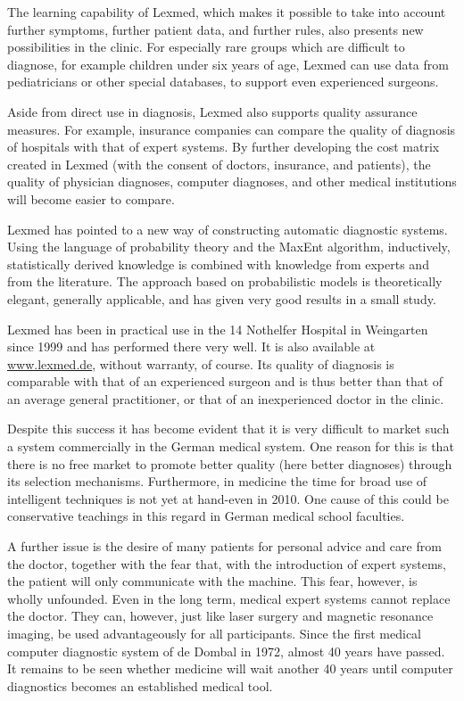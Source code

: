 \documentclass[10pt]{book}
\begin{document}
The learning capability of Lexmed, which makes it possible to take into account further symptoms, further patient data, and further rules, also presents new possibilities in the clinic. For especially rare groups which are difficult to diagnose, for example children under six years of age, Lexmed can use data from pediatricians or other special databases, to support even experienced surgeons.

Aside from direct use in diagnosis, Lexmed also supports quality assurance measures. For example, insurance companies can compare the quality of diagnosis of hospitals with that of expert systems. By further developing the cost matrix created in Lexmed (with the consent of doctors, insurance, and patients), the quality of physician diagnoses, computer diagnoses, and other medical institutions will become easier to compare.

Lexmed has pointed to a new way of constructing automatic diagnostic systems. Using the language of probability theory and the MaxEnt algorithm, inductively,\\
statistically derived knowledge is combined with knowledge from experts and from the literature. The approach based on probabilistic models is theoretically elegant, generally applicable, and has given very good results in a small study.

Lexmed has been in practical use in the 14 Nothelfer Hospital in Weingarten since 1999 and has performed there very well. It is also available at \href{http://www.lexmed.de}{www.lexmed.de}, without warranty, of course. Its quality of diagnosis is comparable with that of an experienced surgeon and is thus better than that of an average general practitioner, or that of an inexperienced doctor in the clinic.

Despite this success it has become evident that it is very difficult to market such a system commercially in the German medical system. One reason for this is that there is no free market to promote better quality (here better diagnoses) through its selection mechanisms. Furthermore, in medicine the time for broad use of intelligent techniques is not yet at hand-even in 2010. One cause of this could be conservative teachings in this regard in German medical school faculties.

A further issue is the desire of many patients for personal advice and care from the doctor, together with the fear that, with the introduction of expert systems, the patient will only communicate with the machine. This fear, however, is wholly unfounded. Even in the long term, medical expert systems cannot replace the doctor. They can, however, just like laser surgery and magnetic resonance imaging, be used advantageously for all participants. Since the first medical computer diagnostic system of de Dombal in 1972, almost 40 years have passed. It remains to be seen whether medicine will wait another 40 years until computer diagnostics becomes an established medical tool.
\end{document}
